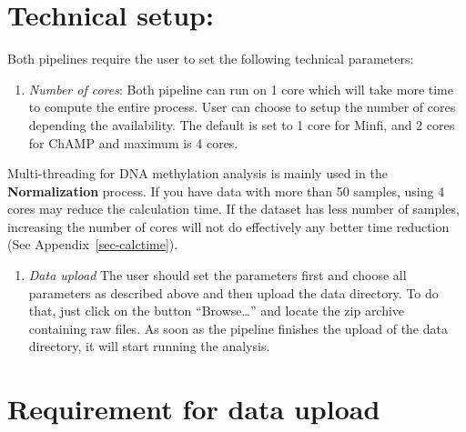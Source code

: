 \documentclass[
  a4paper,
  DIV=11,
  numbers=noendperiod,
  oneside,
  open=any]{scrreport}
\providecommand{\tightlist}{%
  \setlength{\itemsep}{0pt}\setlength{\parskip}{0pt}}\usepackage{longtable,booktabs,array}
\begin{document}
\section{Technical setup:}\label{technical-setup}

Both pipelines require the user to set the following technical
parameters:

\begin{enumerate}
\def\labelenumi{\arabic{enumi}.}
\tightlist
\item
  \emph{Number of cores}: Both pipeline can run on 1 core which will
  take more time to compute the entire process. User can choose to setup
  the number of cores depending the availability. The default is set to
  1 core for Minfi, and 2 cores for ChAMP and maximum is 4 cores.
\end{enumerate}

\begin{tcolorbox}[enhanced jigsaw, opacityback=0, toprule=.15mm, bottomtitle=1mm, colback=white, rightrule=.15mm, breakable, coltitle=black, colbacktitle=quarto-callout-note-color!10!white, toptitle=1mm, arc=.35mm, colframe=quarto-callout-note-color-frame, bottomrule=.15mm, opacitybacktitle=0.6, titlerule=0mm, leftrule=.75mm, title=\textcolor{quarto-callout-note-color}{\faInfo}\hspace{0.5em}{Note}, left=2mm]

Multi-threading for DNA methylation analysis is mainly used in the
\textbf{Normalization} process. If you have data with more than 50
samples, using 4 cores may reduce the calculation time. If the dataset
has less number of samples, increasing the number of cores will not do
effectively any better time reduction (See Appendix~\ref{sec-calctime}).

\end{tcolorbox}

\begin{enumerate}
\def\labelenumi{\arabic{enumi}.}
\setcounter{enumi}{1}
\tightlist
\item
  \emph{Data upload} The user should set the parameters first and choose
  all parameters as described above and then upload the data directory.
  To do that, just click on the button ``Browse\ldots{}'' and locate the
  zip archive containing raw files. As soon as the pipeline finishes the
  upload of the data directory, it will start running the analysis.
\end{enumerate}

\section{Requirement for data upload}\label{requirement-for-data-upload}
\end{document}
